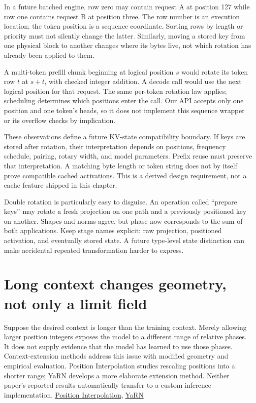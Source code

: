 In a future batched engine, row zero may contain request A at position
127 while row one contains request B at position three. The row number
is an execution location; the token position is a sequence coordinate.
Sorting rows by length or priority must not silently change the latter.
Similarly, moving a stored key from one physical block to another
changes where its bytes live, not which rotation has already been
applied to them.

A multi-token prefill chunk beginning at logical position \(s\) would
rotate its token row \(t\) at \(s+t\), with checked integer addition. A
decode call would use the next logical position for that request. The
same per-token rotation law applies; scheduling determines which
positions enter the call. Our API accepts only one position and one
token's heads, so it does not implement this sequence wrapper or its
overflow checks by implication.

These observations define a future KV-state compatibility boundary. If
keys are stored after rotation, their interpretation depends on
positions, frequency schedule, pairing, rotary width, and model
parameters. Prefix reuse must preserve that interpretation. A matching
byte length or token string does not by itself prove compatible cached
activations. This is a derived design requirement, not a cache feature
shipped in this chapter.

Double rotation is particularly easy to disguise. An operation called
``prepare keys'' may rotate a fresh projection on one path and a
previously positioned key on another. Shapes and norms agree, but phase
now corresponds to the sum of both applications. Keep stage names
explicit: raw projection, positioned activation, and eventually stored
state. A future type-level state distinction can make accidental
repeated transformation harder to express.

\section{Long context changes geometry, not only a limit
field}\label{long-context-changes-geometry-not-only-a-limit-field}


Suppose the desired context is longer than the training context. Merely
allowing larger position integers exposes the model to a different range
of relative phases. It does not supply evidence that the model has
learned to use those phases. Context-extension methods address this
issue with modified geometry and empirical evaluation. Position
Interpolation studies rescaling positions into a shorter range; YaRN
develops a more elaborate extension method. Neither paper's reported
results automatically transfer to a custom inference implementation.
\href{https://arxiv.org/abs/2306.15595}{Position Interpolation},
\href{https://arxiv.org/abs/2309.00071}{YaRN}

